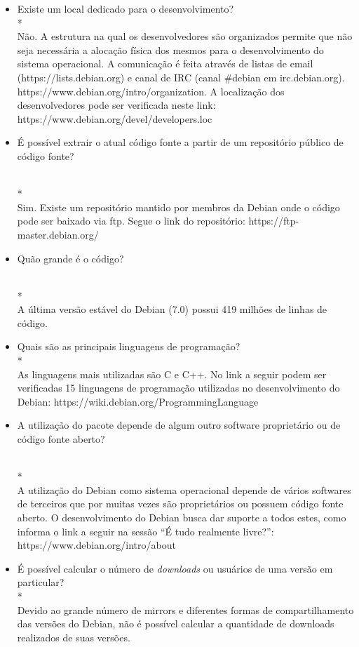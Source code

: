\documentclass[12pt,a4paper]{article} %
\begin{document}
\begin{itemize}
\item Existe um local dedicado para o desenvolvimento?
\\*
	\\Não. A estrutura na qual os desenvolvedores são organizados permite que não seja necessária a alocação física dos mesmos para o desenvolvimento do sistema operacional. A comunicação é feita através de listas de email (https://lists.debian.org) e canal de IRC (canal \#debian em irc.debian.org). https://www.debian.org/intro/organization. A localização dos desenvolvedores pode ser verificada neste link: https://www.debian.org/devel/developers.loc
\linebreak
\item É possível extrair o atual código fonte a partir de um repositório público de código fonte?

\\*
	\\Sim. Existe um repositório mantido por membros da Debian onde o código pode ser baixado via ftp. Segue o link do repositório: https://ftp-master.debian.org/
\linebreak

\item Quão grande é o código?

\\*
\\A última versão estável do Debian (7.0) possui 419 milhões de linhas de código.
\linebreak

\item Quais são as principais linguagens de programação?
\\*
\\As linguagens mais utilizadas são C e C++. No link a seguir podem ser verificadas 15 linguagens de programação utilizadas no desenvolvimento do Debian: https://wiki.debian.org/ProgrammingLanguage
\linebreak

\item A utilização do pacote depende de algum outro software proprietário ou de código fonte aberto?

\\*
\\A utilização do Debian como sistema operacional depende de vários softwares de terceiros que por muitas vezes são proprietários ou possuem código fonte aberto. O desenvolvimento do Debian busca dar suporte a todos estes, como informa o link a seguir na sessão “É tudo realmente livre?”: https://www.debian.org/intro/about
\linebreak

\item É possível calcular o número de \textit{downloads} ou usuários de uma versão em particular?
\\*
\\Devido ao grande número de mirrors e diferentes formas de compartilhamento das versões do Debian, não é possível calcular a quantidade de downloads realizados de suas versões.
\linebreak

\end{itemize}
\end{document}
